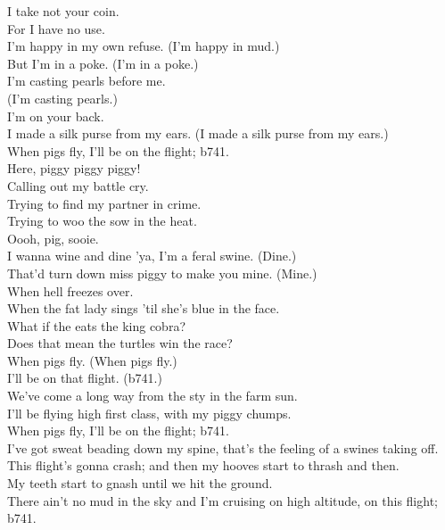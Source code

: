 I take not your coin. \\
For I have no use. \\
I'm happy in my own refuse. (I'm happy in mud.) \\

But I'm in a poke. (I'm in a poke.) \\
I'm casting pearls before me. \\
(I'm casting pearls.) \\
I'm on your back. \\
I made a silk purse from my ears. (I made a silk purse from my ears.) \\

When pigs fly, I'll be on the flight; b741. \\

Here, piggy piggy piggy! \\

Calling out my battle cry. \\
Trying to find my partner in crime. \\
Trying to woo the sow in the heat. \\
Oooh, pig, sooie. \\

I wanna wine and dine 'ya, I'm a feral swine. (Dine.) \\
That'd turn down miss piggy to make you mine. (Mine.) \\

When hell freezes over. \\
When the fat lady sings 'til she's blue in the face. \\
What if the  eats the king cobra? \\
Does that mean the turtles win the race? \\

When pigs fly. (When pigs fly.) \\
I'll be on that flight. (b741.) \\

We've come a long way from the sty in the farm sun. \\
I'll be flying high first class, with my piggy chumps. \\

When pigs fly, I'll be on the flight; b741. \\

I've got sweat beading down my spine, that's the feeling of a swines taking off. \\
This flight's gonna crash; and then my hooves start to thrash and then. \\
My teeth start to gnash until we hit the ground. \\
There ain't no mud in the sky and I'm cruising on high altitude, on this flight; b741. \\

